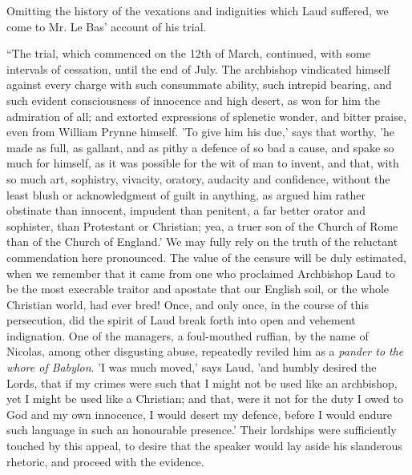 Omitting the history of the vexations and
indignities which Laud suffered, we come to Mr. Le Bas' account of his
trial.

``The trial, which commenced on the
12th of March, continued, with some intervals of cessation, until the
end of July. The archbishop vindicated himself against every charge with
such consummate ability, such intrepid bearing, and such evident
consciousness of innocence and high desert, as won for him the
admiration of all; and extorted expressions of splenetic wonder, and
bitter praise, even from William Prynne himself. 'To give him his due,'
says that worthy, 'he made as full, as gallant, and as pithy a defence
of so bad a cause, and spake so much for himself, as it was possible for
the wit of man to invent, and that, with so much art, sophistry,
vivacity, oratory, audacity and confidence, without the least blush or
acknowledgment of guilt in anything, as argued him rather obstinate than
innocent, impudent than penitent, a far better orator and sophister,
than Protestant or Christian; yea, a truer son of the Church of Rome
than of the Church of England.' We may fully rely on the truth of the
reluctant commendation here pronounced. The value of the censure will be
duly estimated, when we remember that it came from one who proclaimed
Archbishop Laud to be the most execrable traitor and apostate that our
English soil, or the whole Christian world, had ever bred! Once, and
only once, in the course of this persecution, did the spirit of Laud
break forth into open and vehement indignation. One of the managers, a
foul-mouthed ruffian, by the name of Nicolas, among other disgusting
abuse, repeatedly reviled him as a \emph{pander to the whore of Babylon}.
'I was much moved,' says Laud, 'and humbly desired the Lords, that if my
crimes were such that I might not be used like an archbishop, yet I
might be used like a Christian; and that,
were it not for the duty I owed to God and my own innocence, I would
desert my defence, before I would endure such language in such an
honourable presence.' Their lordships were sufficiently touched by this
appeal, to desire that the speaker would lay aside his slanderous
rhetoric, and proceed with the evidence.

